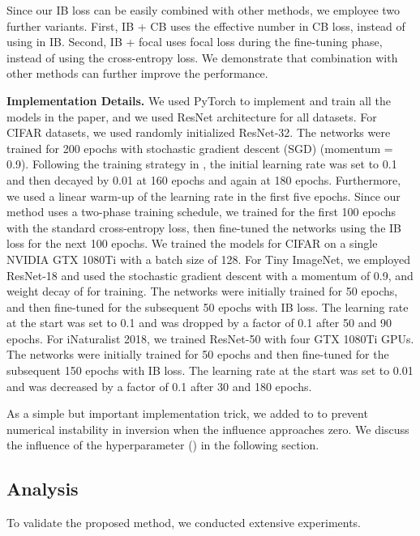 Since our IB loss can be easily combined with other methods, we employee two further variants.
First, IB + CB uses the effective number in CB loss, instead of using  in IB.
Second, IB + focal uses focal loss during the fine-tuning phase, instead of using the cross-entropy loss.
We demonstrate that combination with other methods can further improve the performance.

\textbf{Implementation Details.} \label{sub:impl_detail}
We used PyTorch \cite{ref:Pytorch} to implement and train all the models in the paper, and we used ResNet architecture \cite{ref:resnet_cvpr2016} for all datasets. 
For CIFAR datasets, we used randomly initialized ResNet-32.
The networks were trained for 200 epochs with stochastic gradient descent (SGD) (momentum = 0.9).
Following the training strategy in \cite{ref:cui_belongie_cvpr19, ref:cao_ldam_neurips2019}, the initial learning rate was set to 0.1 and then decayed by 0.01 at 160 epochs and again at 180 epochs. 
Furthermore, we used a linear warm-up of the learning rate \cite{ref:goyal_he_corr2017} in the first five epochs.
Since our method uses a two-phase training schedule, we trained for the first 100 epochs with the standard cross-entropy loss, then fine-tuned the networks using the IB loss for the next 100 epochs.
We trained the models for CIFAR on a single NVIDIA GTX 1080Ti with a batch size of 128.
For Tiny ImageNet, we employed ResNet-18 and used the stochastic gradient descent with a momentum of 0.9, and weight decay of  for training. 
The networks were initially trained for 50 epochs, and then fine-tuned for the subsequent 50 epochs with IB loss.
The learning rate at the start was set to 0.1 and was dropped by a factor of 0.1 after 50 and 90 epochs.
For iNaturalist 2018, we trained ResNet-50 with four GTX 1080Ti GPUs.
The networks were initially trained for 50 epochs and then fine-tuned for the subsequent 150 epochs with IB loss.
The learning rate at the start was set to 0.01 and was decreased by a factor of 0.1 after 30 and 180 epochs.

As a simple but important implementation trick, we added  to  to prevent numerical instability in inversion when the influence approaches zero.
We discuss the influence of the hyperparameter () in the following section.

\subsection{Analysis}
To validate the proposed method, we conducted extensive experiments.

